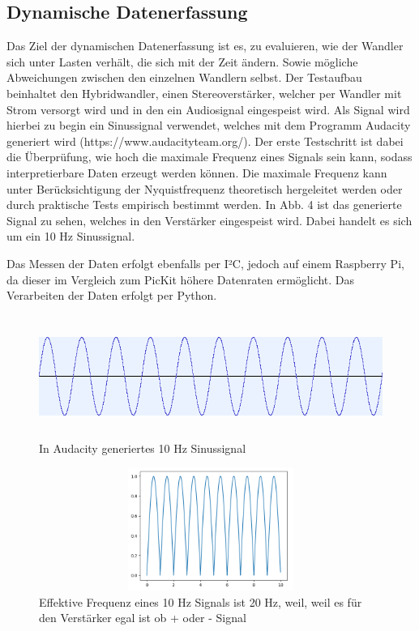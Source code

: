 \subsection{Dynamische Datenerfassung}
\begin{flushleft}
Das Ziel der dynamischen Datenerfassung ist es, zu evaluieren, wie der Wandler sich unter Lasten verhält, die sich mit der Zeit ändern. Sowie mögliche Abweichungen zwischen den einzelnen Wandlern selbst. Der Testaufbau beinhaltet den Hybridwandler, einen Stereoverstärker, welcher per Wandler mit Strom versorgt wird und in den ein Audiosignal eingespeist wird. Als Signal wird hierbei zu begin ein Sinussignal verwendet, welches mit dem Programm Audacity generiert wird (https://www.audacityteam.org/). Der erste Testschritt ist dabei die Überprüfung, wie hoch die maximale Frequenz eines Signals sein kann, sodass interpretierbare Daten erzeugt werden können. Die maximale Frequenz kann unter Berücksichtigung der Nyquistfrequenz theoretisch hergeleitet werden oder durch praktische Tests empirisch bestimmt werden. In Abb. 4 ist das generierte Signal zu sehen, welches in den Verstärker eingespeist wird. Dabei handelt es sich um ein 10 Hz Sinussignal. 

Das Messen der Daten erfolgt ebenfalls per I²C, jedoch auf einem Raspberry Pi, da dieser im Vergleich zum PicKit höhere Datenraten ermöglicht. Das Verarbeiten der Daten erfolgt per Python. 
\end{flushleft}

\begin{figure}
    \centering
    \includegraphics[height= 4cm, width = 12cm]{Pictures/Sinus_Aud.png}
    \caption{In Audacity generiertes 10 Hz Sinussignal}
\end{figure}

\begin{figure}
    \centering
    \includegraphics[height= 4cm, width = 12cm]{Pictures/Clapped_Sine.png}
    \caption{Effektive Frequenz eines 10 Hz Signals ist 20 Hz, weil, weil es für den Verstärker egal ist ob + oder - Signal }
\end{figure}

